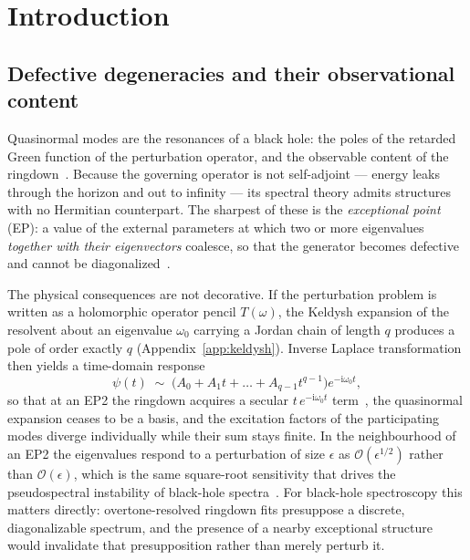 \documentclass[aps,prd,reprint,superscriptaddress,nofootinbib,longbibliography]{revtex4-2}
\theoremstyle{plain}
\theoremstyle{definition}
\theoremstyle{remark}
\newcommand{\ii}{\mathrm{i}}
\newcommand{\Ord}{\mathcal{O}}
\begin{document}
\maketitle

\section{Introduction}\label{sec:intro}

\subsection{Defective degeneracies and their observational content}
\label{sec:intro:eps}

Quasinormal modes are the resonances of a black hole: the poles of the retarded
Green function of the perturbation operator, and the observable content of the
ringdown~\cite{Kokkotas1999D46,Berti2009D47,Konoplya2011D48,Bertietal2025D50}.
Because the governing operator is not self-adjoint --- energy leaks through the
horizon and out to infinity --- its spectral theory admits structures with no
Hermitian counterpart. The sharpest of these is the \emph{exceptional point}
(EP): a value of the external parameters at which two or more eigenvalues
\emph{together with their eigenvectors} coalesce, so that the generator becomes
defective and cannot be diagonalized~\cite{KatoE71,Bergholtz2019E63,%
Ashida2020E64}.

The physical consequences are not decorative. If the perturbation problem is
written as a holomorphic operator pencil $T(\omega)$, the Keldysh expansion of
the resolvent about an eigenvalue $\omega_0$ carrying a Jordan chain of length
$q$ produces a pole of order exactly $q$ (Appendix~\ref{app:keldysh}). Inverse
Laplace transformation then yields a time-domain response
\begin{equation}\label{eq:secular}
  \psi(t) \;\sim\; \Big(A_0 + A_1 t + \dots + A_{q-1}t^{q-1}\Big)
  e^{-\ii\omega_0 t},
\end{equation}
so that at an EP2 the ringdown acquires a secular $t\,e^{-\ii\omega_0 t}$
term~\cite{PanossoMacedoetal2025B30,Motohashi2024B24}, the quasinormal expansion
ceases to be a basis, and the excitation factors of the participating modes
diverge individually while their sum stays finite. In the neighbourhood of an
EP2 the eigenvalues respond to a perturbation of size $\epsilon$ as
$\Ord(\epsilon^{1/2})$ rather than $\Ord(\epsilon)$, which is the same
square-root sensitivity that drives the pseudospectral instability of black-hole
spectra~\cite{Jaramillo2020C36,Jaramillo2021C37,Destounisetal2021C38}. For
black-hole spectroscopy this matters directly: overtone-resolved ringdown fits
presuppose a discrete, diagonalizable spectrum, and the presence of a nearby
exceptional structure would invalidate that presupposition rather than merely
perturb it.
\end{document}

